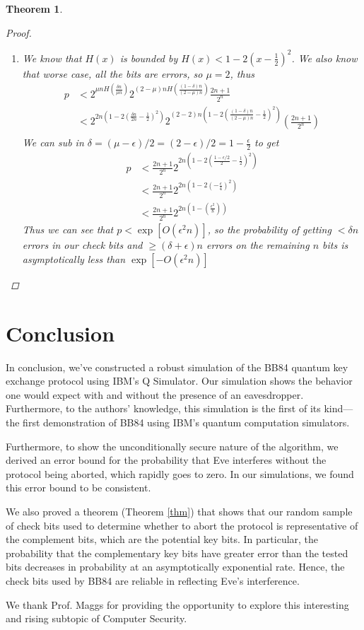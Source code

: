 \documentclass[12]{amsart}
\newtheorem{theorem}{Theorem}[section]
\begin{document}
\begin{theorem}
\begin{proof}
\begin{enumerate}
\begin{align*}
\end{align*}
\item We know that $H(x)$ is bounded by $H(x)<1-2(x-\frac{1}{2})^2$. We also know that worse case, all the bits are errors, so $\mu=2$, thus
\begin{align*}
p&<2^{\mu n H(\frac{\delta n}{\mu n})}2^{(2-\mu)nH(\frac{(1-\delta)n}{(2-\mu)n})}\frac{2n+1}{2^n}\\
&<2^{2n(1-2(\frac{\delta n}{2n}-\frac{1}{2})^2)}2^{(2-2)n(1-2(\frac{(1-\delta)n}{(2-\mu)n}-\frac{1}{2})^2)}(
\frac{2n+1}{2^n})\\
\end{align*}
We can sub in $\delta=(\mu-\epsilon)/2=(2-\epsilon)/2=1-\frac{\epsilon}{2}$ to get
\begin{align*}
p&<\frac{2n+1}{2^n}2^{2n(1-2(\frac{1-\epsilon/2}{2}-\frac{1}{2})^2)}\\
&<\frac{2n+1}{2^n}2^{2n(1-2(-\frac{\epsilon}{4})^2)}\\
&<\frac{2n+1}{2^n}2^{2n(1-(\frac{\epsilon^2}{8}))}
\end{align*}
Thus we can see that $p<\exp[O(\epsilon^2n)]$, so the probability of getting $< \delta n$ errors in our check bits and $\geq (\delta+\epsilon)n$ errors on the remaining $n$ bits is asymptotically less than $\exp[-O(\epsilon^2n)]$
\end{enumerate}
\end{proof}
\end{theorem}

\section{Conclusion}

In conclusion, we've constructed a robust simulation of the BB84 quantum key exchange protocol using IBM's Q Simulator. Our simulation shows the behavior one would expect with and without the presence of an eavesdropper. Furthermore, to the authors' knowledge, this simulation is the first of its kind---the first demonstration of BB84 using IBM's quantum computation simulators. 

Furthermore, to show the unconditionally secure nature of the algorithm, we derived an error bound for the probability that Eve interferes without the protocol being aborted, which rapidly goes to zero. In our simulations, we found this error bound to be consistent.

We also proved a theorem (Theorem \ref{thm}) that shows that our random sample of check bits used to determine whether to abort the protocol is representative of the complement bits, which are the potential key bits. In particular, the probability that the complementary key bits have greater error than the tested bits decreases in probability at an asymptotically exponential rate. Hence, the check bits used by BB84 are reliable in reflecting Eve's interference. 

We thank Prof. Maggs for providing the opportunity to explore this interesting and rising subtopic of Computer Security. 

\nocite{*}


\end{document}

